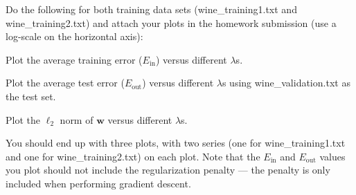 \problem[16]
Do the following for both training data sets (wine\_training1.txt and wine\_training2.txt) and attach your plots in the homework submission (use a log-scale on the horizontal axis):

\subproblem Plot the average training error ($E_\text{in}$) versus different $\lambda$s.

\subproblem Plot the average test error ($E_\text{out}$) versus different $\lambda$s using wine\_validation.txt as the test set.

\subproblem Plot the $\ell_2$ norm of $\mathbf{w}$ versus different $\lambda$s. \medskip

 You should end up with three plots, with two series (one for wine\_training1.txt and one for wine\_training2.txt) on each plot. Note that the $E_\text{in}$ and $E_\text{out}$ values you plot should not include the regularization penalty --- the penalty is only included when performing gradient descent.

